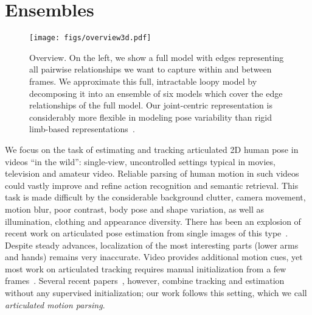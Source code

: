 \chapter{Ensembles}


\begin{figure}[t!]
\centering
\texttt{[image: figs/overview3d.pdf]}
\caption{\small \label{fig:overview} Overview. On the left, we show a full model with edges representing all pairwise relationships we want to capture within and between frames.  We approximate this full, intractable loopy model by decomposing it into an ensemble of six models which cover the edge relationships of the full model.  Our joint-centric representation is considerably more flexible in modeling pose variability than rigid limb-based representations~\cite{ferrari08,sapp2010cascades,andriluka09}.}
\label{fig:overview}
\end{figure}


We focus on the task of estimating and tracking articulated 2D human pose in videos ``in the wild'': single-view, uncontrolled settings typical in movies, television and amateur video.   Reliable
parsing of human motion in such videos could vastly improve and refine action 
recognition and semantic retrieval. This task is made difficult by the 
considerable background clutter, camera movement, motion blur, poor contrast, 
body pose and shape variation, as well as illumination, clothing and appearance 
diversity. There has been an explosion of recent work on articulated pose 
estimation from single images of this type~\cite{ronfard02, 
miko04,felzps,ramanan06,ferrari08,eichner09, andriluka09,sapp2010cascades}.  
Despite steady advances, localization of the most interesting parts (lower arms 
and hands) remains very inaccurate.  Video provides additional motion cues, yet 
most work on articulated tracking requires manual initialization from a few
frames~\cite{cardboard02,bregler98,balan06,sminchisescu03,ren07,buehler08}.  
Several recent papers~\cite{sigal04, lan05,ramanan05,ferrari08,weisssapp10}, 
however, combine tracking and estimation without any supervised initialization; 
our work follows this setting, which we call {\em articulated motion parsing}.

